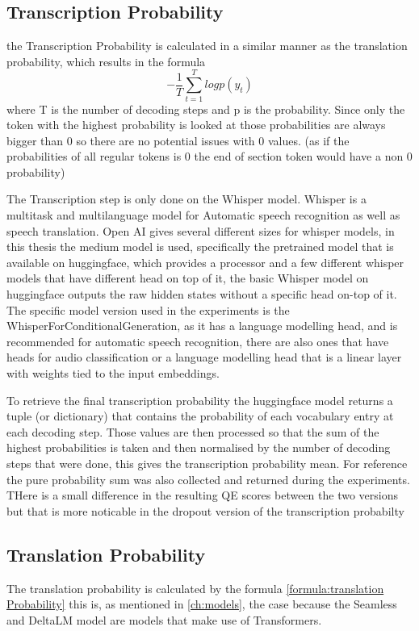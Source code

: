 \subsection{Transcription Probability}
the Transcription Probability is calculated in a similar manner as the translation probability, which results in the formula $$-\frac{1}{T}\sum_{t=1}^T log p(y_t)$$ where T is the number of decoding steps and p is the probability.
Since only the token with the highest probability is looked at those probabilities are always bigger than 0 so there are no potential issues with 0 values. (as if the probabilities of all regular tokens is 0 the end of section token would have a non 0 probability)

The Transcription step is only done on the Whisper model.
Whisper \cite{radford2022robust} is a multitask and multilanguage model for Automatic speech recognition as well as speech translation. 
Open AI gives several different sizes for whisper models, in this thesis the medium model is used, specifically the pretrained model that is available on huggingface, which provides a processor and a few different whisper models that have different head on top of it, the basic Whisper model on huggingface outputs the raw hidden states without a specific head on-top of it. 
The specific model version used in the experiments is the WhisperForConditionalGeneration, as it has a language modelling head, and is recommended for automatic speech recognition, there are also ones that have heads for audio classification or a language modelling head that is a linear layer with weights tied to the input embeddings. 

To retrieve the final transcription probability the huggingface model returns a tuple (or dictionary) that contains the probability of each vocabulary entry at each decoding step.
Those values are then processed so that the sum of the highest probabilities is taken and then normalised by the number of decoding steps that were done, this gives the transcription probability mean. For reference the pure probability sum was also collected and returned during the experiments. 
THere is a small difference in the resulting QE scores between the two versions but that is more noticable in the dropout version of the transcription probabilty 

\subsection{Translation Probability}\label{sect:translationprob}
The translation probability is calculated by the formula \autoref{formula:translation Probability} this is, as mentioned in \autoref{ch:models}, the case because the Seamless and DeltaLM model are models that make use of Transformers. 

